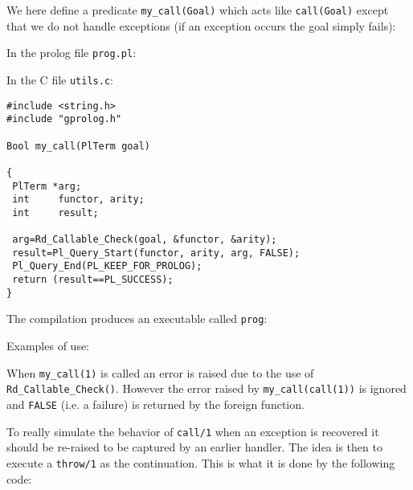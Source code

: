 We here define a predicate \texttt{my\_call(Goal)} which acts like
\texttt{call(Goal)} except that we do not handle exceptions (if an exception
occurs the goal simply fails):

In the prolog file \texttt{prog.pl}:


In the C file \texttt{utils.c}:

\begin{Indentation}
\begin{verbatim}
#include <string.h>
#include "gprolog.h"

Bool my_call(PlTerm goal)

{
 PlTerm *arg;
 int     functor, arity;
 int     result;

 arg=Rd_Callable_Check(goal, &functor, &arity);
 result=Pl_Query_Start(functor, arity, arg, FALSE);
 Pl_Query_End(PL_KEEP_FOR_PROLOG);
 return (result==PL_SUCCESS);
}
\end{verbatim}
\end{Indentation}

The compilation produces an executable called \texttt{prog}:


Examples of use:

\begin{CodeTwoCols}
\SkipLine
{}
\SkipLine
{}
\SkipLine
{}
\SkipLine
{}
\SkipLine
{}
\SkipLine
{}
\SkipLine
{}
\end{CodeTwoCols}

When \texttt{my\_call(1)} is called an error is raised due to the use of
\texttt{Rd\_Callable\_Check()}. However the error raised by
\texttt{my\_call(call(1))} is ignored and \texttt{FALSE} (i.e. a failure) is
returned by the foreign function. 

To really simulate the behavior of \texttt{call/1} when an exception
is recovered it should be re-raised to be captured by an earlier
handler. The idea is then to execute a \texttt{throw/1} as the
continuation. This is what it is done by the following code:

